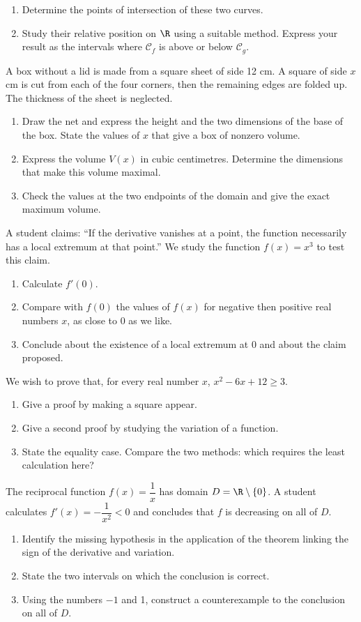 \begin{enumerate}[label=\arabic*.]
\item Determine the points of intersection of these two curves.
\item Study their relative position on $\R$ using a suitable method. Express your result as the intervals where $\mathcal C_f$ is above or below $\mathcal C_g$.
\end{enumerate}
A box without a lid is made from a square sheet of side 12 cm. A square of side $x$ cm is cut from each of the four corners, then the remaining edges are folded up. The thickness of the sheet is neglected.
\begin{enumerate}[label=\arabic*.]
\item Draw the net and express the height and the two dimensions of the base of the box. State the values of $x$ that give a box of nonzero volume.
\item Express the volume $V(x)$ in cubic centimetres. Determine the dimensions that make this volume maximal.
\item Check the values at the two endpoints of the domain and give the exact maximum volume.
\end{enumerate}

A student claims: ``If the derivative vanishes at a point, the function necessarily has a local extremum at that point.'' We study the function $f(x)=x^3$ to test this claim.
\begin{enumerate}[label=\arabic*.]
\item Calculate $f\prime(0)$.
\item Compare with $f(0)$ the values of $f(x)$ for negative then positive real numbers $x$, as close to 0 as we like.
\item Conclude about the existence of a local extremum at 0 and about the claim proposed.
\end{enumerate}
We wish to prove that, for every real number $x$, $x^2-6x+12\geq3$.
\begin{enumerate}[label=\arabic*.]
\item Give a proof by making a square appear.
\item Give a second proof by studying the variation of a function.
\item State the equality case. Compare the two methods: which requires the least calculation here?
\end{enumerate}
The reciprocal function $f(x)=\dfrac1x$ has domain $D=\R\setminus\{0\}$. A student calculates $f\prime(x)=-\dfrac1{x^2}<0$ and concludes that $f$ is decreasing on all of $D$.
\begin{enumerate}[label=\arabic*.]
\item Identify the missing hypothesis in the application of the theorem linking the sign of the derivative and variation.
\item State the two intervals on which the conclusion is correct.
\item Using the numbers $-1$ and 1, construct a counterexample to the conclusion on all of $D$.
\end{enumerate}
